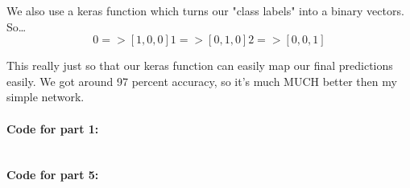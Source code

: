 \documentclass[12pt]{article}
\begin{document}
    We also use a keras function which turns our "class labels" into a binary vectors. So\dots
    \[
        0 => [1, 0, 0]
        1 => [0, 1, 0]
        2 => [0, 0, 1]
    \]

    This really just so that our keras function can easily map our final predictions easily.
    We got around 97 percent accuracy, so it's much MUCH better then my simple network.

    \paragraph{Code for part 1:}
    \inputminted{python}{Szemis_hw3_part1.py}

    \paragraph{Code for part 5:}
    \inputminted{python}{Szemis_hw3_part5.py}
\end{document}
